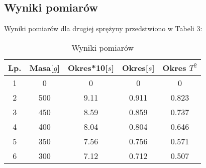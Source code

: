 \documentclass{article} %
\begin{document}
\subsection{Wyniki pomiarów}
Wyniki pomiarów dla drugiej sprężyny przedstwiono w Tabeli 3:
\begin{table}[h!]
\centering
\begin{tabular}{|c|c|c|c|c|}
\hline
\textbf{Lp.} & \textbf{Masa[$g$]} & \textbf{Okres*10[$s$]} & \textbf{Okres[$s$]} & \textbf{Okres $T^2$}\\
\hline
1 & 0 & 0 & 0 & 0\\
2 & 500 & 9.11 & 0.911 & 0.823\\
3 & 450 & 8.59 & 0.859 & 0.737\\
4 & 400 & 8.04 & 0.804 & 0.646\\
5 & 350 & 7.56 & 0.756 & 0.571\\
6 & 300 & 7.12 & 0.712 & 0.507\\
\hline
\end{tabular}
\caption{Wyniki pomiarów}
\label{table:students}
\end{table}
\end{document}

